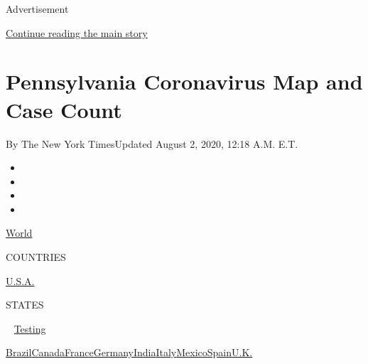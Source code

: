 Advertisement

\protect\hyperlink{after-top}{Continue reading the main story}

\hypertarget{pennsylvania-coronavirus-map-and-case-count}{%
\section{Pennsylvania Coronavirus Map and Case
Count}\label{pennsylvania-coronavirus-map-and-case-count}}

By The New York TimesUpdated August 2, 2020, 12:18 A.M. E.T.

\begin{itemize}
\item
\item
\item
\item
\end{itemize}

\href{https://www.nytimes.com/interactive/2020/world/coronavirus-maps.html}{World}~

COUNTRIES

\textbar{}
\href{https://www.nytimes.com/interactive/2020/us/coronavirus-us-cases.html}{U.S.A.}~

STATES

~
\href{https://www.nytimes.com/interactive/2020/us/coronavirus-testing.html}{Testing}

\href{https://www.nytimes.com/interactive/2020/world/americas/brazil-coronavirus-cases.html}{Brazil}\href{https://www.nytimes.com/interactive/2020/world/canada/canada-coronavirus-cases.html}{Canada}\href{https://www.nytimes.com/interactive/2020/world/europe/france-coronavirus-cases.html}{France}\href{https://www.nytimes.com/interactive/2020/world/europe/germany-coronavirus-cases.html}{Germany}\href{https://www.nytimes.com/interactive/2020/world/asia/india-coronavirus-cases.html}{India}\href{https://www.nytimes.com/interactive/2020/world/europe/italy-coronavirus-cases.html}{Italy}\href{https://www.nytimes.com/interactive/2020/world/americas/mexico-coronavirus-cases.html}{Mexico}\href{https://www.nytimes.com/interactive/2020/world/europe/spain-coronavirus-cases.html}{Spain}\href{https://www.nytimes.com/interactive/2020/world/europe/united-kingdom-coronavirus-cases.html}{U.K.}

